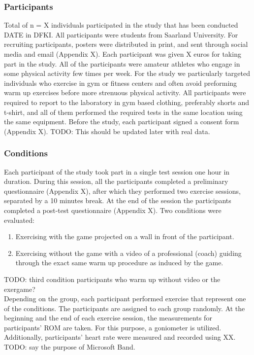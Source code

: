 \subsubsection{Participants}
Total of n = X individuals participated in the study that has been conducted DATE in DFKI. All participants were students from Saarland University. For recruiting participants, posters were distributed in print, and sent through social media and email (Appendix X). Each participant was given X euros for taking part in the study. All of the participants were amateur athletes who engage in some physical activity few times per week. For the study we particularly targeted individuals who exercise in gym or fitness centers and often avoid preforming warm up exercises before more strenuous physical activity. All participants were required to report to the laboratory in gym based
clothing, preferably shorts and t-shirt, and all of them performed the required tests in the same location using the same equipment. Before the study, each participant signed a consent form (Appendix X). TODO: This should be updated later with real data.
\subsubsection{Conditions}
Each participant of the study took part in a single test session one hour in duration. During this session, all the participants completed a preliminary questionnaire (Appendix X), after which they performed two exercise sessions, separated by a 10 minutes break. At the end of the session the participants completed a post-test questionnaire (Appendix X). Two conditions were evaluated:
\begin{enumerate}
\item Exercising with the game projected on a wall in front of the participant.
\item Exercising without the game with a video of a professional (coach) guiding through the exact same warm up procedure as induced by the game.
\end{enumerate}
TODO: third condition participants who warm up without video or the exergame?\\
Depending on the group, each participant performed exercise that represent one of the conditions. The participants are assigned to each group randomly.
At the beginning and the end of each exercise session, the measurements for participants' ROM are taken. For this purpose, a goniometer is utilized. Additionally, participants' heart rate were measured and recorded using XX. TODO: say the purpose of Microsoft Band. 
